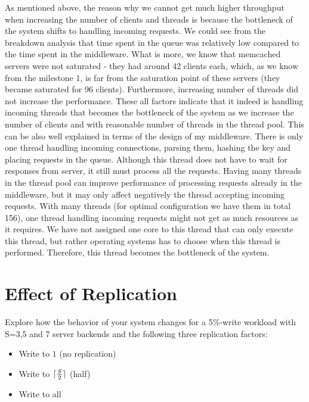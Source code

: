 \documentclass[11pt]{article}
\DeclarePairedDelimiter{\ceil}{\lceil}{\rceil}
\begin{document}
As mentioned above, the reason why we cannot get much higher throughput when increasing the number of clients and threads is because the bottleneck of the system shifts to handling incoming requests. We could see from the breakdown analysis that time spent in the queue was relatively low compared to the time spent in the middleware. What is more, we know that memcached servers were not saturated - they had around 42 clients each, which, as we know from the milestone 1, is far from the saturation point of these servers (they became saturated for 96 clients). Furthermore, increasing number of threads did not increase the performance. These all factors indicate that it indeed is handling incoming threads that becomes the bottleneck of the system as we increase the number of clients and with reasonable number of threads in the thread pool. This can be also well explained in terms of the design of my middleware. There is only one thread handling incoming connections, parsing them, hashing the key and placing requests in the queue. Although this thread does not have to wait for responses from server, it still must process all the requests. Having many threads in the thread pool can improve performance of processing requests already in the middleware, but it may only affect negatively the thread accepting incoming requests. With many threads (for optimal configuration we have them in total 156), one thread handling incoming requests might not get as much resources as it requires. We have not assigned one core to this thread that can only execute this thread, but rather operating systems has to choose when this thread is performed. Therefore, this thread becomes the bottleneck of the system. 


\clearpage


\section{Effect of Replication}
\label{sec:replication}

\iffalse
Explore how the behavior of your system changes for a 5\%-write workload with S=3,5 and 7 server backends and the following three replication factors:
\begin{itemize} 
\item Write to $1$ (no replication) 
\item Write to $\ceil{\frac{S}{2}}$ (half) 
\item Write to all 
\end{itemize}
\end{document}
